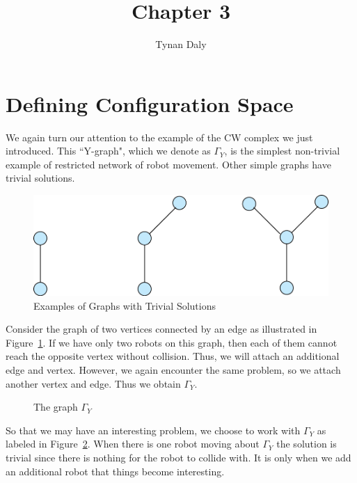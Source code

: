 \documentclass{amsart}
\title{Chapter 3}
\author{Tynan Daly}
\newcommand{\Y}{\Gamma_Y}
\begin{document}
\maketitle
\section{Defining Configuration Space}\label{sec:productspace}

We again turn our attention to the example of the CW complex we just introduced. This ``Y-graph", which we denote as $\Y$, is the simplest non-trivial example of restricted network of robot movement. Other simple graphs have trivial solutions.

\begin{figure}[h]\label{fig:trivial}
\centering
\caption{Examples of Graphs with Trivial Solutions}
\includegraphics[scale=.5]{Building_Y.png}
\end{figure}


Consider the graph of two vertices connected by an edge as illustrated in Figure~\ref{fig:trivial}. If we have only two robots on this graph, then each of them cannot reach the opposite vertex without collision. Thus, we will attach an additional edge and vertex. However, we again encounter the same problem, so we attach another vertex and edge. Thus we obtain $\Y$. 

\begin{figure}[h]
\caption{The graph $\Y$}
\centering
{}
\label{fig:maze}
\end{figure}

So that we may have an interesting problem, we choose to work with $\Y$ as labeled in Figure~\ref{fig:maze}. When there is one robot moving about $\Y$ the solution is trivial since there is nothing for the robot to collide with. It is only when we add an additional robot that things become interesting. 
\end{document}
